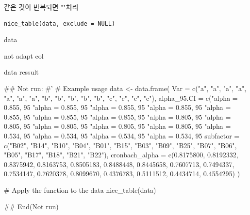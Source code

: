 \documentclass[a4paper]{book}
\begin{document}
%
\begin{Description}
같은 것이 반복되면 ""처리
\end{Description}
%
\begin{Usage}
\begin{verbatim}
nice_table(data, exclude = NULL)
\end{verbatim}
\end{Usage}
%
\begin{Arguments}
\begin{ldescription}
\item[\code{data}] data

\item[\code{exclude}] not adapt col
\end{ldescription}
\end{Arguments}
%
\begin{Value}
data ressult
\end{Value}
%
\begin{Examples}
\begin{ExampleCode}

\#\# Not run: 
#'
# Example usage
data <- data.frame(
  Var = c("a", "a", "a", "a", "a", "a", "a", "b",
  "b", "b", "b", "b", "c", "c", "c", "c"),
  alpha_95.CI = c("alpha = 0.855, 95%
  "alpha = 0.855, 95%
                  "alpha = 0.855, 95%
                  "alpha = 0.855, 95%
                  "alpha = 0.855, 95%
                  "alpha = 0.855, 95%
                  "alpha = 0.855, 95%
                  "alpha = 0.805, 95%
                  "alpha = 0.805, 95%
                  "alpha = 0.805, 95%
                  "alpha = 0.805, 95%
                  "alpha = 0.805, 95%
                  "alpha = 0.534, 95%
                  "alpha = 0.534, 95%
                  "alpha = 0.534, 95%
                  "alpha = 0.534, 95%
  subfactor = c("B02", "B14", "B10", "B04", "B01", "B15",
   "B03", "B09", "B25", "B07", "B06", "B05", "B17",
   "B18", "B21", "B22"),
  cronbach_alpha = c(0.8175800, 0.8192332,
  0.8375942, 0.8163753, 0.8505183, 0.8488448,
   0.8445658, 0.7607713, 0.7494337,
                     0.7534147, 0.7620378,
                      0.8099670, 0.4376783,
                       0.5111512, 0.4434714, 0.4554295)
)

# Apply the function to the data
nice_table(data)


## End(Not run)


\end{ExampleCode}
\end{Examples}
\end{document}
